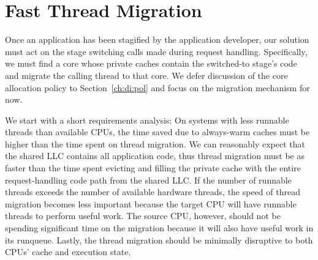 \documentclass[12pt,a4paper]{book}
\begin{document}
\section{Fast Thread Migration}\label{ch:di:mig}
Once an application has been stagified by the application developer, our solution must act on the stage switching calls made during request handling.
Specifically, we must find a core whose private caches contain the switched-to stage's code and migrate the calling thread to that core.
We defer discussion of the core allocation policy to Section~\ref{ch:di:pol} and focus on the migration mechanism for now.

We start with a short requirements analysis:
On systems with less runnable threads than available CPUs, the time saved due to always-warm caches must be higher than the time spent on thread migration.
We can reasonably expect that the shared LLC contains all application code,  thus thread migration must be as faster than the time spent evicting and filling the private cache with the entire request-handling code path from the shared LLC.
If the number of runnable threads exceeds the number of available hardware threads, the speed of thread migration becomes less important because the target CPU will have runnable threads to perform useful work.
The source CPU, however, should not be spending significant time on the migration because it will also have useful work in its runqueue.
Lastly, the thread migration should be minimally disruptive to both CPUs' cache and execution state.
\end{document}

